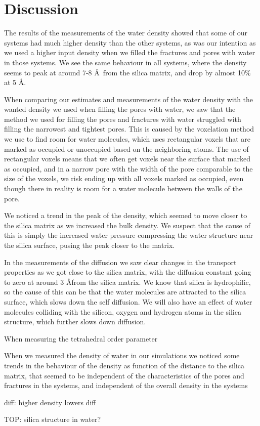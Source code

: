 \chapter{Discussion}
The results of the measurements of the water density showed that some of our systems had much higher density than the other systems, as was our intention as we used a higher input density when we filled the fractures and pores with water in those systems. We see the same behaviour in all systems, where the density seems to peak at around 7-8 \AA\ from the silica matrix, and drop by almost 10\% at 5 \AA.

When comparing our estimates and measurements of the water density with the wanted density we used when filling the pores with water, we saw that the method we used for filling the pores and fractures with water struggled with filling the narrowest and tightest pores. This is caused by the voxelation method we use to find room for water molecules, which uses rectangular voxels that are marked as occupied or unoccupied based on the neighboring atoms. The use of rectangular voxels means that we often get voxels near the surface that marked as occupied, and in a narrow pore with the width of the pore comparable to the size of the voxels, we risk ending up with all voxels marked as occupied, even though there in reality is room for a water molecule between the walls of the pore.

We noticed a trend in the peak of the density, which seemed to move closer to the silica matrix as we increased the bulk density. We suspect that the cause of this is simply the increased water pressure compressing the water structure near the silica surface, pusing the peak closer to the matrix.

In the measurements of the diffusion we saw clear changes in the transport properties as we got close to the silica matrix, with the diffusion constant going to zero at around 3 \AA from the silica matrix. We know that silica is hydrophilic, so the cause of this can be that the water molecules are attracted to the silica surface, which slows down the self diffusion. We will also have an effect of water molecules colliding with the silicon, oxygen and hydrogen atoms in the silica structure, which further slows down diffusion.

When measuring the tetrahedral order parameter


When we measured the density of water in our simulations we noticed some trends in the behaviour of the density as function of the distance to the silica matrix, that seemed to be independent of the characteristics of the pores and fractures in the systems, and independent of the overall density in the systems

diff: higher density lowers diff

TOP: silica structure in water?